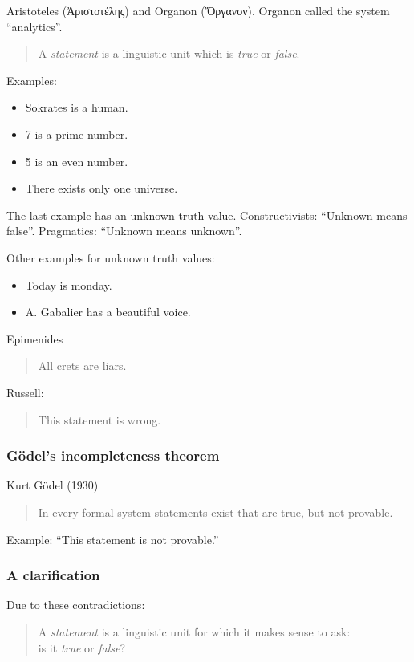 \documentclass[a4paper,landscape,twocolumn]{article}
\newcommand{\textgreek}[1]{\begingroup\fontencoding{LGR}\selectfont#1\endgroup}
\begin{document}
Aristoteles (\textgreek{Ἀριστοτέλης}) and Organon (\textgreek{Ὄργανον}).
Organon called the system \enquote{analytics}.

\begin{quote}
  A \emph{statement} is a linguistic unit which is \emph{true} or \emph{false}.
\end{quote}

Examples:
\begin{itemize}
  \item Sokrates is a human.
  \item 7 is a prime number.
  \item 5 is an even number.
  \item There exists only one universe.
\end{itemize}

The last example has an unknown truth value.
Constructivists: \enquote{Unknown means false}.
Pragmatics: \enquote{Unknown means unknown}.

Other examples for unknown truth values:
\begin{itemize}
  \item Today is monday.
  \item A. Gabalier has a beautiful voice.
\end{itemize}

Epimenides
\begin{quote}
  All crets are liars.
\end{quote}

Russell:
\begin{quote}
  This statement is wrong.
\end{quote}

\subsubsection{Gödel's incompleteness theorem}

Kurt Gödel (1930)
\begin{quote}
  In every formal system statements exist that
  are true, but not provable.
\end{quote}

Example: \enquote{This statement is not provable.}

\subsubsection{A clarification}

Due to these contradictions:
\begin{quote}
  A \emph{statement} is a linguistic unit for which it makes sense to ask: \\
  is it \emph{true} or \emph{false}?
\end{quote}
\end{document}
